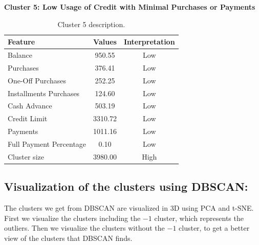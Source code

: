 \begin{center}
\centering
\textbf{Cluster 5: Low Usage of Credit with Minimal Purchases or Payments}
\begin{table}[H]
\centering
\begin{tabular}{|l|c|c|}
\hline
\textbf{Feature} & \textbf{Values} & \textbf{Interpretation} \\ \hline
Balance & 950.55 & Low \\ \hline
Purchases & 376.41 & Low \\ \hline
One-Off Purchases & 252.25 & Low \\ \hline
Installments Purchases & 124.60 & Low \\ \hline
Cash Advance & 503.19 & Low \\ \hline
Credit Limit & 3310.72 & Low \\ \hline
Payments & 1011.16 & Low \\ \hline
Full Payment Percentage & 0.10 & Low \\ \hline
Cluster size & 3980.00 & High \\ \hline
\end{tabular}
\caption{Cluster 5 description.}
\end{table}
\end{center}

\subsection{Visualization of the clusters using DBSCAN:}

The clusters we get from DBSCAN are visualized in 3D using PCA and t-SNE. First we visualize the clusters including the $-1$ cluster, which represents the outliers. Then we visualize the clusters without the $-1$ cluster, to get a better view of the clusters that DBSCAN finds.

